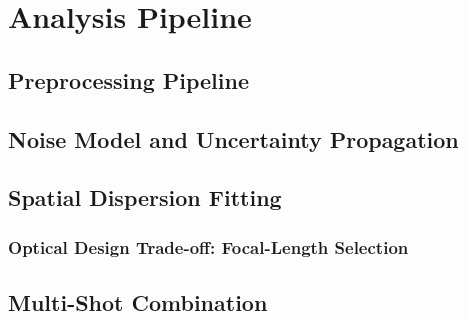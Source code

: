 \chapter{Analysis Pipeline}
\label{chap:analysis-pipeline}

\section{Preprocessing Pipeline}
\label{sec:pipeline-preprocessing}


\section{Noise Model and Uncertainty Propagation}
\label{sec:pipeline-noise-model}


\section{Spatial Dispersion Fitting}
\label{sec:pipeline-dispersion-fitting}


\subsection{Optical Design Trade-off: Focal-Length Selection}
\label{sec:pipeline-focal-length-tradeoff}


\section{Multi-Shot Combination}
\label{sec:pipeline-multi-shot}

